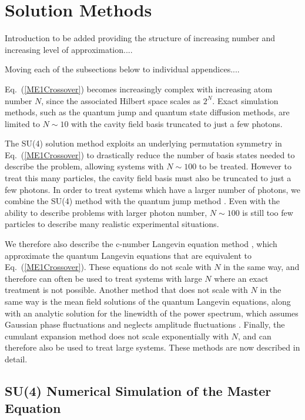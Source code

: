 \documentclass[aps,prl,twocolumn,
superscriptaddress,groupedaddress]{revtex4}
\begin{document}
\section{Solution Methods}

Introduction to be added providing the structure of increasing number
and increasing level of approximation....

Moving each of the subsections below to individual appendices....

Eq.~(\ref{ME1Crossover}) becomes increasingly complex with increasing
atom number $N$, since the associated Hilbert space scales as $2^N$.
Exact simulation methods, such as the quantum jump and quantum state
diffusion methods, are limited to $N\sim10$ with the cavity field basis
truncated to just a few photons.

The SU(4) solution method \cite{Hartmann:arXiv1201.1732}
\cite{Holland13} exploits an underlying permutation symmetry in
Eq.~(\ref{ME1Crossover}) to drastically reduce the number of basis
states needed to describe the problem, allowing systems with
$N\sim100$ to be treated. However to treat this many particles, the
cavity field basis must also be truncated to just a few photons. In
order to treat systems which have a larger number of photons, we
combine the SU(4) method with the quantum jump method
\cite{Dalibard92} \cite{Dum92} \cite{Knight98}. Even with the ability
to describe problems with larger photon number, $N\sim100$ is still
too few particles to describe many realistic experimental situations.

We therefore also describe the c-number Langevin equation method
\cite{Scully97, PhysRevA.47.1431}, which approximate the quantum
Langevin equations that are equivalent to Eq.~(\ref{ME1Crossover}).
These equations do not scale with $N$ in the same way, and therefore can
often be used to treat systems with large $N$ where an exact treatment
is not possible. Another method that does not scale with $N$ in the same
way is the mean field solutions of the quantum Langevin equations, along
with an analytic solution for the linewidth of the power spectrum, which
assumes Gaussian phase fluctuations and neglects amplitude fluctuations
\cite{HakenLaser, HakenLaserBook}. Finally, the cumulant expansion
method \cite{JPSJ.17.1100} does not scale exponentially with $N$, and
can therefore also be used to treat large systems. These methods are now
described in detail.


\subsection{SU(4) Numerical Simulation of the Master Equation}
\end{document}
